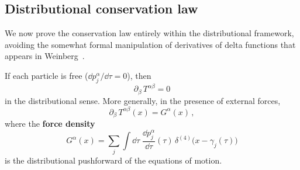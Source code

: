 \subsection{Distributional conservation law}\label{sec:conservation-add}

We now prove the conservation law entirely within the
distributional framework, avoiding the somewhat formal manipulation
of derivatives of delta functions that appears in
Weinberg~\cite[\S2.8]{Weinberg72}.

\begin{theorem}%
\label{thm:conservation}
  If each particle is free ($\dd p_j^\alpha/\dd\tau = 0$), then
  \begin{equation}\label{eq:conservation}
    \partial_\beta\, T^{\alpha\beta} = 0
  \end{equation}
  in the distributional sense.  More generally, in the presence of
  external forces,
  \begin{equation}\label{eq:conservation-force}
    \partial_\beta\, T^{\alpha\beta}(x) = G^\alpha(x)\,,
  \end{equation}
  where the \textbf{force density}
  \[
    G^\alpha(x) = \sum_j \int\!\dd\tau\;
      \frac{\dd p_j^\alpha}{\dd\tau}(\tau)\,
      \delta^{(4)}\!\bigl(x - \gamma_j(\tau)\bigr)
  \]
  is the distributional pushforward of the equations of motion.
\end{theorem}

